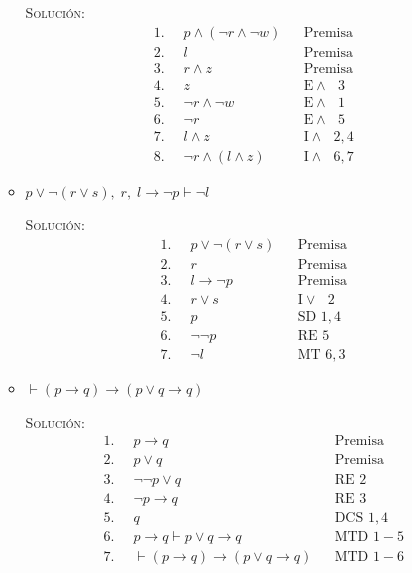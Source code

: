 \documentclass[letterpaper,11pt]{article}
\begin{document}
\begin{enumerate}
\begin{itemize}
        \textsc{Solución:}
        \begin{align*}
            1.& \; \; p \land (\neg r \land \neg w)
            && \text{Premisa} \\ 
            2.& \; \; l
            && \text{Premisa} \\ 
            3.& \; \; r \land z
            && \text{Premisa} \\ 
            4.& \; \; z
            && \text{E$\land$ $3$} \\ 
            5.& \; \; \neg r \land \neg w
            && \text{E$\land$ $1$} \\
            6.& \; \; \neg r
            && \text{E$\land$ $5$} \\ 
            7.& \; \; l \land z
            && \text{I$\land$ $2,4$} \\ 
            8.& \; \; \neg r \land (l \land z)
            && \text{I$\land$ $6, 7$}
        \end{align*}

        \item $p \lor \neg(r \lor s), \; r, \; l → \neg p ⊢ \neg l$
        
        \textsc{Solución:}
        \begin{align*}
            1.& \; \; p \lor \neg(r \lor s)
            && \text{Premisa} \\ 
            2.& \; \; r
            && \text{Premisa} \\ 
            3.& \; \; l → \neg p
            && \text{Premisa} \\ 
            4.& \; \; r \lor s
            && \text{I$\lor$ $2$} \\
            5.& \; \; p
            && \text{SD $1, 4$} \\ 
            6.& \; \; \neg \neg p
            && \text{RE $5$} \\ 
            7.& \; \; \neg l
            && \text{MT $6, 3$}
        \end{align*}

        \item $⊢(p → q) → (p \lor q → q)$

        \textsc{Solución:}
        \begin{align*}
            1.& \; \; p → q
            && \text{Premisa} \\
            2.& \; \; p \lor q
            && \text{Premisa} \\
            3.& \; \; \neg \neg p \lor q
            && \text{RE $2$} \\ 
            4.& \; \; \neg p → q
            && \text{RE $3$} \\ 
            5.& \; \; q
            && \text{DCS $1, 4$} \\ 
            6.& \; \; p→ q \vdash p \lor q → q
            && \text{MTD $1 - 5$} \\ 
            7.& \; \; \vdash (p → q) → (p \lor q → q)
            && \text{MTD $1 - 6$}
        \end{align*}
    \end{itemize}


\end{enumerate}
\end{document}
